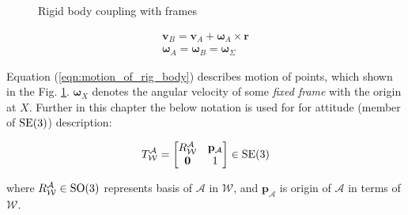 \begin{figure}[H]
    \caption{Rigid body coupling with frames}
    \label{fig:coupling_rigid_body}
\end{figure}

\begin{equation}
    \begin{aligned}
        \mathbf{v}_B = \mathbf{v}_A + 
        \boldsymbol{\omega}_A \times \mathbf{r} \\
        \boldsymbol{\omega}_A = \boldsymbol{\omega}_B 
        = \boldsymbol{\omega}_{\Sigma}
    \end{aligned}
    \label{eqn:motion_of_rig_body}
\end{equation}

Equation (\ref{eqn:motion_of_rig_body}) describes motion of points, which 
shown in the Fig. {\ref{fig:coupling_rigid_body}}. $\boldsymbol{\omega}_X$ 
denotes the angular velocity of some \emph{fixed frame} with the origin at $X$.
Further in this chapter the below notation is used for for attitude (member of $\text{SE}(3)$) 
description:

\begin{equation}
    T_{\mathcal{W}}^{\mathcal{A}} = 
    \begin{bmatrix}
        R^{\mathcal{A}}_{\mathcal{W}} & \mathbf{p}_{\mathcal{A}} \\
        \mathbf{0} & 1
    \end{bmatrix}
    \in \text{SE}(3)
    \label{eqn:se_3_element}
\end{equation}

where $R^{\mathcal{A}}_{\mathcal{W}} \in \text{SO}(3)$ represents basis of $\mathcal{A}$ 
in $\mathcal{W}$, and $\mathbf{p}_{\mathcal{A}}$ is origin of $\mathcal{A}$ in 
terms of $\mathcal{W}$.

